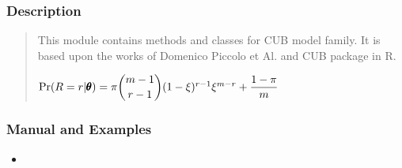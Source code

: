 \documentclass[letterpaper,10pt,english]{sphinxmanual}
\begin{document}
\subsubsection{Description}
\label{\detokenize{cubmods:description}}\begin{quote}

\sphinxAtStartPar
This module contains methods and classes
for CUB model family.
It is based upon the works of Domenico
Piccolo et Al. and CUB package in R.

\sphinxAtStartPar
\(\Pr(R=r|\pmb{\theta}) = \pi \dbinom{m-1}{r-1}(1-\xi)^{r-1}\xi^{m-r}+\dfrac{1-\pi}{m}\)
\end{quote}


\subsubsection{Manual and Examples}
\label{\detokenize{cubmods:manual-and-examples}}\begin{itemize}
\item {} 
\sphinxAtStartPar
{}

\end{itemize}
\end{document}
